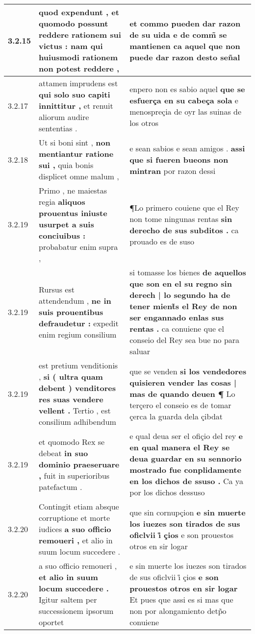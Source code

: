 \begin{tabular}{|p{1cm}|p{6.5cm}|p{6.5cm}|}
3.2.15 & quod expendunt , et quomodo possunt \textbf{ reddere rationem sui victus : } nam qui huiusmodi rationem non potest reddere , & et commo pueden dar razon de su uida \textbf{ e de comm̃ se mantienen } ca aquel que non puede dar razon desto señal \\\hline
3.2.17 & attamen imprudens est \textbf{ qui solo suo capiti innittitur , } et renuit aliorum audire sententias . & enpero non es sabio aquel \textbf{ que se esfuerça en su cabeça sola } e menospreçia de oyr las suinas de los otros \\\hline
3.2.18 & Ut si boni sint , \textbf{ non mentiantur ratione sui , } quia bonis displicet omne malum , & e sean sabios e sean amigos . \textbf{ assi que si fueren bueons non mintran } por razon dessi \\\hline
3.2.19 & Primo , ne maiestas regia \textbf{ aliquos prouentus iniuste usurpet a suis conciuibus : } probabatur enim supra , & ¶Lo primero couiene que el Rey non tome ningunas rentas \textbf{ sin derecho de sus subditos . } ca prouado es de suso \\\hline
3.2.19 & Rursus est attendendum , \textbf{ ne in suis prouentibus defraudetur : } expedit enim regium consilium & si tomasse los bienes \textbf{ de aquellos que son en el su regno sin derech | lo segundo ha de tener mient̃s el Rey de non ser engannado enlas sus rentas . } ca conuiene que el conseio del Rey sea bue no para saluar \\\hline
3.2.19 & est pretium venditionis , \textbf{ si ( ultra quam debent ) venditores res suas vendere vellent . } Tertio , est consilium adhibendum & que se venden \textbf{ si los vendedores quisieren vender las cosas | mas de quando deuen ¶ } Lo terçero el conseio es de tomar çerca la guarda dela çibdat \\\hline
3.2.19 & et quomodo Rex se debeat \textbf{ in suo dominio praeseruare , } fuit in superioribus patefactum . & e qual deua ser el ofiçio del rey \textbf{ e en qual manera el Rey se deua guardar en su sennorio mostrado fue conplidamente en los dichos de ssuso . } Ca ya por los dichos dessuso \\\hline
3.2.20 & Contingit etiam absque corruptione et morte iudices \textbf{ a suo officio remoueri , } et alio in suum locum succedere . & que sin cornupçion \textbf{ e sin muerte los iuezes son tirados de sus oficlvii i̊ çios } e son prouestos otros en sir logar \\\hline
3.2.20 & a suo officio remoueri , \textbf{ et alio in suum locum succedere . } Igitur saltem per successionem ipsorum oportet & e sin muerte los iuezes son tirados de sus oficlvii i̊ çios \textbf{ e son prouestos otros en sir logar } Et pues que assi es si mas que non por alongamiento detp̃o conuiene \\\hline

\end{tabular}
